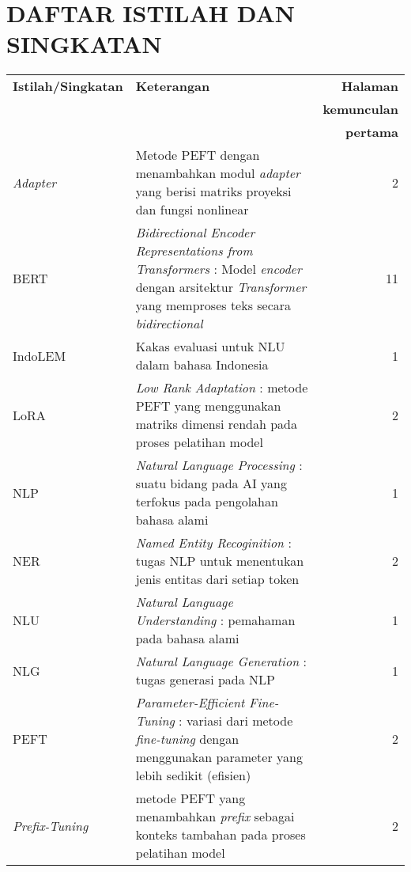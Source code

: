 \clearpage
\chapter*{DAFTAR ISTILAH DAN SINGKATAN}
\begin{center}
   \begin{table}[h]
        \renewcommand{\arraystretch}{1.5}
        \begin{tabularx}{\textwidth}{lXr}
            \textbf{Istilah/Singkatan} & \textbf{Keterangan} & \textbf{Halaman} \\
                                       & & \textbf{kemunculan} \\
                                       & & \textbf{pertama} \\
            \textit{Adapter} & Metode PEFT dengan menambahkan modul \textit{adapter} yang berisi matriks proyeksi dan fungsi nonlinear & 2 \\
            BERT & \textit{Bidirectional Encoder Representations from Transformers} : Model \textit{encoder} dengan arsitektur \textit{Transformer} yang memproses teks secara \textit{bidirectional} & 11 \\
            IndoLEM & Kakas evaluasi untuk NLU dalam bahasa Indonesia & 1 \\
            LoRA & \textit{Low Rank Adaptation} : metode PEFT yang menggunakan matriks dimensi rendah pada proses pelatihan model & 2 \\
            NLP & \textit{Natural Language Processing} : suatu bidang pada AI yang terfokus pada pengolahan bahasa alami & 1 \\
            NER & \textit{Named Entity Recoginition} : tugas NLP untuk menentukan jenis entitas dari setiap token & 2 \\
            NLU & \textit{Natural Language Understanding} : pemahaman pada bahasa alami & 1 \\
            NLG & \textit{Natural Language Generation} : tugas generasi pada NLP & 1 \\
            PEFT & \textit{Parameter-Efficient Fine-Tuning} : variasi dari metode \textit{fine-tuning} dengan menggunakan parameter yang lebih sedikit (efisien) & 2 \\
            \textit{Prefix-Tuning} & metode PEFT yang menambahkan \textit{prefix} sebagai konteks tambahan pada proses pelatihan model & 2 \\
        \end{tabularx}
    \end{table}
\end{center}

